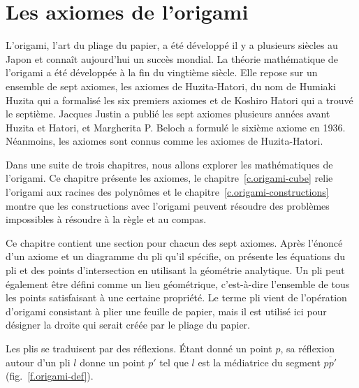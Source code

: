 \chapter{Les axiomes de l'origami}\label{c.origami-axioms}





L'origami, l'art du pliage du papier, a été développé il y a plusieurs siècles au Japon et connaît aujourd'hui un succès mondial. La théorie mathématique de l'origami a été développée à la fin du vingtième siècle. Elle repose sur un ensemble de sept axiomes, les \og axiomes de  Huzita-Hatori\fg{}, du nom de Humiaki Huzita qui a formalisé les six premiers axiomes et de Koshiro Hatori qui a trouvé le septième. Jacques Justin a publié les sept axiomes plusieurs années avant Huzita et Hatori, et Margherita P. Beloch a formulé le sixième axiome en 1936. Néanmoins, les axiomes sont connus comme les axiomes de Huzita-Hatori.

Dans une suite de trois chapitres, nous allons explorer les mathématiques de l'origami. Ce chapitre présente les axiomes, le chapitre~\ref{c.origami-cube} relie l'origami aux racines des polynômes et le chapitre~\ref{c.origami-constructions} montre que les constructions avec l'origami peuvent résoudre des problèmes impossibles à résoudre à la règle et au compas.
 
Ce chapitre contient une section pour chacun des sept axiomes. Après l'énoncé d'un axiome et un diagramme du pli qu'il spécifie, on présente les équations du pli et des points d'intersection en utilisant la géométrie analytique. Un pli peut également être défini comme un lieu géométrique, c'est-à-dire l'ensemble de tous les points satisfaisant à une certaine propriété. Le terme \og pli\fg{} vient de l'opération d'origami consistant à plier une feuille de papier, mais il est utilisé ici pour désigner la droite qui serait créée par le pliage du papier.

Les plis se traduisent par des réflexions. Étant donné un point $p$, sa réflexion autour d'un pli $l$ donne un point $p'$ tel que $l$ est la médiatrice du segment  $\overline{pp'}$  (fig.~\ref{f.origami-def}).

